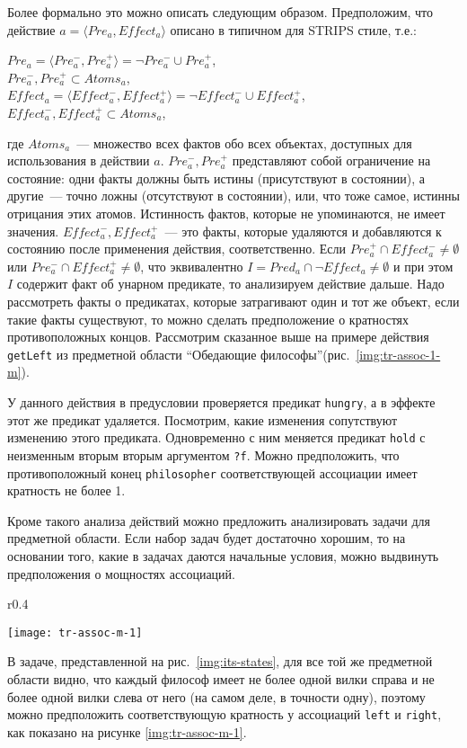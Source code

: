 Более формально это можно описать следующим образом.
Предположим, что действие $a = \langle Pre_a, Effect_a \rangle$ описано в типичном для STRIPS стиле, т.е.:
\begin{center}
$Pre_a = \langle Pre_a^-, Pre_a^+ \rangle = \neg Pre_a^- \cup Pre_a^+ $,\\
$Pre_a^-, Pre_a^+ \subset Atoms_a$, \\
$Effect_a = \langle Effect_a^-, Effect_a^+ \rangle = \neg Effect_a^- \cup Effect_a^+$, \\
$Effect_a^-, Effect_a^+ \subset Atoms_a$,\\
\end{center}
где $Atoms_a$~--- множество всех фактов обо всех объектах, доступных для использования в действии $a$. $Pre_a^-, Pre_a^+$ представляют собой ограничение на состояние: одни факты должны быть истины (присутствуют в состоянии), а другие~--- точно ложны (отсутствуют в состоянии), или, что тоже самое, истинны отрицания этих атомов.
Истинность фактов, которые не упоминаются, не имеет значения. 
$Effect_a^-, Effect_a^+$~--- это факты, которые удаляются и добавляются к состоянию после применения действия, соответственно.
Если $Pre_a^+ \cap Effect_a^- \not= \emptyset$ или $Pre_a^- \cap Effect_a^+ \not= \emptyset$, что эквивалентно $I = Pred_a \cap \neg Effect_a \not = \emptyset$ и при этом $I$ содержит факт об унарном предикате, то анализируем действие дальше. 
Надо рассмотреть факты о предикатах, которые затрагивают один и тот же объект, если такие факты существуют, то можно сделать предположение о кратностях противоположных концов. Рассмотрим сказанное выше на примере действия \texttt{getLeft} из предметной области ``Обедающие философы''(рис.~\ref{img:tr-assoc-1-m}).

У данного действия в предусловии проверяется предикат \texttt{hungry}, а в эффекте этот же предикат удаляется.
Посмотрим, какие изменения сопутствуют изменению этого предиката.
Одновременно с ним меняется предикат \texttt{hold} с неизменным вторым вторым аргументом \texttt{?f}. 
Можно предположить, что противоположный конец \texttt{philosopher} соответствующей ассоциации имеет кратность не более 1.

Кроме такого анализа действий можно предложить анализировать задачи для предметной области. 
Если набор задач будет достаточно хорошим, то на основании того, какие в задачах даются начальные условия, можно выдвинуть предположения о мощностях ассоциаций. 
\begin{wrapfigure}{r}{0.4\linewidth}
{\centering
    \texttt{[image: tr-assoc-m-1]}
    \caption{Восстановление кратности из задачи планирования}\label{img:tr-assoc-m-1}
}
\end{wrapfigure}
В задаче, представленной на рис.~\ref{img:its-states}, для все той же предметной области видно, что каждый философ имеет не более одной вилки справа и не более одной вилки слева от него (на самом деле, в точности одну), поэтому можно предположить соответствующую кратность у ассоциаций \texttt{left} и \texttt{right}, как показано на рисунке \ref{img:tr-assoc-m-1}.

